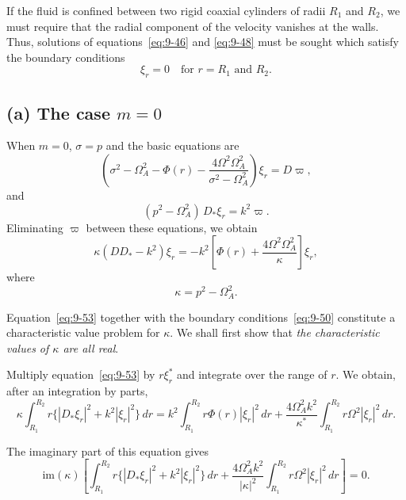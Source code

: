 If the fluid is confined between two rigid coaxial cylinders of radii $R_1$ and $R_2$, we must require that the radial component of the velocity vanishes at the walls. Thus, solutions of equations~\eqref{eq:9-46} and \eqref{eq:9-48} must be sought which satisfy the boundary conditions
\begin{equation}
\xi_r = 0 \quad \text{for } r = R_1 \text{ and } R_2. \label{eq:9-50}
\end{equation}

\subsection*{(a) The case $m = 0$}

When $m = 0$, $\sigma = p$ and the basic equations are
\begin{equation}
\left(\sigma^2 - \Omega_A^2 - \Phi(r) - \frac{4\Omega^2\Omega_A^2}{\sigma^2 - \Omega_A^2}\right)\xi_r = D\varpi, \label{eq:9-51}
\end{equation}
and
\begin{equation}
(p^2 - \Omega_A^2)\, D_*\xi_r = k^2\varpi. \label{eq:9-52}
\end{equation}
Eliminating $\varpi$ between these equations, we obtain
\begin{equation}
\kappa (DD_* - k^2)\xi_r = -k^2 \left[\Phi(r) + \frac{4\Omega^2\Omega_A^2}{\kappa}\right]\xi_r, \label{eq:9-53}
\end{equation}
where
\begin{equation}
\kappa = p^2 - \Omega_A^2. \label{eq:9-54}
\end{equation}

Equation~\eqref{eq:9-53} together with the boundary conditions~\eqref{eq:9-50} constitute a characteristic value problem for $\kappa$. We shall first show that \emph{the characteristic values of $\kappa$ are all real}.

Multiply equation~\eqref{eq:9-53} by $r\xi_r^*$ and integrate over the range of $r$. We obtain, after an integration by parts,
\begin{equation}
\kappa \int_{R_1}^{R_2} r\{|D_*\xi_r|^2 + k^2|\xi_r|^2\}\, dr = k^2 \int_{R_1}^{R_2} r\Phi(r)|\xi_r|^2\, dr + \frac{4\Omega_A^2 k^2}{\kappa^*} \int_{R_1}^{R_2} r\Omega^2|\xi_r|^2\, dr. \label{eq:9-55}
\end{equation}

The imaginary part of this equation gives
\begin{equation}
\mathrm{im}(\kappa) \left[\int_{R_1}^{R_2} r\{|D_*\xi_r|^2 + k^2|\xi_r|^2\}\, dr + \frac{4\Omega_A^2 k^2}{|\kappa|^2} \int_{R_1}^{R_2} r\Omega^2|\xi_r|^2\, dr\right] = 0. \label{eq:9-56}
\end{equation}

